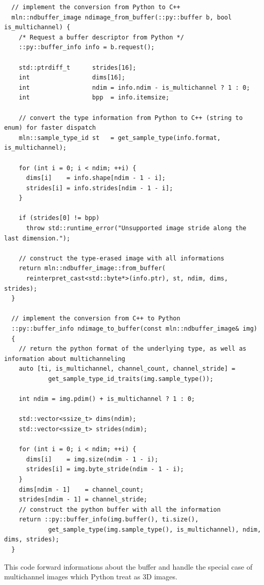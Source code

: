 \begin{verbatim}
  // implement the conversion from Python to C++
  mln::ndbuffer_image ndimage_from_buffer(::py::buffer b, bool is_multichannel) {
    /* Request a buffer descriptor from Python */
    ::py::buffer_info info = b.request();

    std::ptrdiff_t      strides[16];
    int                 dims[16];
    int                 ndim = info.ndim - is_multichannel ? 1 : 0;
    int                 bpp  = info.itemsize;

    // convert the type information from Python to C++ (string to enum) for faster dispatch
    mln::sample_type_id st   = get_sample_type(info.format, is_multichannel);

    for (int i = 0; i < ndim; ++i) {
      dims[i]    = info.shape[ndim - 1 - i];
      strides[i] = info.strides[ndim - 1 - i];
    }

    if (strides[0] != bpp)
      throw std::runtime_error("Unsupported image stride along the last dimension.");

    // construct the type-erased image with all informations
    return mln::ndbuffer_image::from_buffer(
      reinterpret_cast<std::byte*>(info.ptr), st, ndim, dims, strides);
  }

  // implement the conversion from C++ to Python
  ::py::buffer_info ndimage_to_buffer(const mln::ndbuffer_image& img)
  {
    // return the python format of the underlying type, as well as information about multichanneling
    auto [ti, is_multichannel, channel_count, channel_stride] =
            get_sample_type_id_traits(img.sample_type());

    int ndim = img.pdim() + is_multichannel ? 1 : 0;

    std::vector<ssize_t> dims(ndim);
    std::vector<ssize_t> strides(ndim);

    for (int i = 0; i < ndim; ++i) {
      dims[i]    = img.size(ndim - 1 - i);
      strides[i] = img.byte_stride(ndim - 1 - i);
    }
    dims[ndim - 1]    = channel_count;
    strides[ndim - 1] = channel_stride;
    // construct the python buffer with all the information
    return ::py::buffer_info(img.buffer(), ti.size(),
            get_sample_type(img.sample_type(), is_multichannel), ndim, dims, strides);
  }
\end{verbatim}

This code forward informations about the buffer and handle the special case of multichannel images which Python treat
as 3D images.


